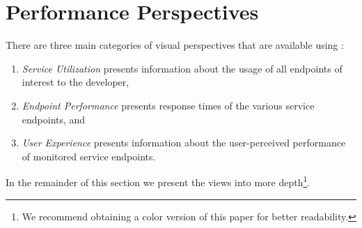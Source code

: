 \documentclass[conference]{IEEEtran}
\begin{document}
  

\section{Performance Perspectives}
\label{sec:views}

  There are three main categories of visual perspectives that are available using \tool:
  \begin{enumerate}
    \item \textit{Service Utilization} presents information about the usage of all endpoints of interest to the developer,
    \item \textit{Endpoint Performance} presents response times of the various service endpoints, and
    \item \textit{User Experience} presents information about the user-perceived performance of monitored service endpoints.
  \end{enumerate}

In the remainder of this section we present the views into more depth\footnote{We recommend obtaining a color version of this paper for better readability.}.


\end{document}
